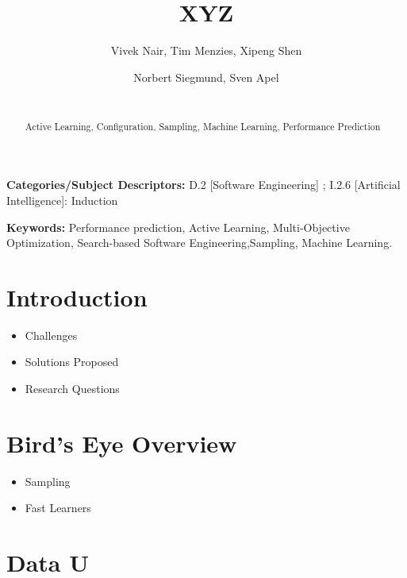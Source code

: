 \documentclass{sig-alternative}
\newcommand{\bi}{\begin{itemize}[leftmargin=0.4cm]}
\newcommand{\ei}{\end{itemize}}
\begin{document}
\title{ XYZ}
\author{
        \alignauthor Vivek Nair, Tim Menzies, Xipeng Shen 
    \and  
        \alignauthor Norbert Siegmund, Sven Apel \\
        \\
       }

\maketitle 
\thispagestyle{plain}
\pagestyle{plain}
\begin{abstract}
Active Learning, Configuration, Sampling, Machine Learning, Performance Prediction


\end{abstract}

\vspace{1mm}
\noindent
{\bf Categories/Subject Descriptors:} 
D.2 [Software Engineering] ;
I.2.6 [Artificial Intelligence]: Induction

 
\vspace{1mm}
\noindent
{\bf Keywords:} Performance prediction, Active Learning, 
Multi-Objective Optimization,
Search-based Software Engineering,Sampling, Machine Learning.

 
 
\section{Introduction}
 
\bi
    \item{Challenges}
    \item{Solutions Proposed}
    \item{Research Questions}
\ei
\section{Bird's Eye Overview}
\bi
    \item{Sampling}
    \item{Fast Learners}
\ei

\section{Data U}
\end{document}
